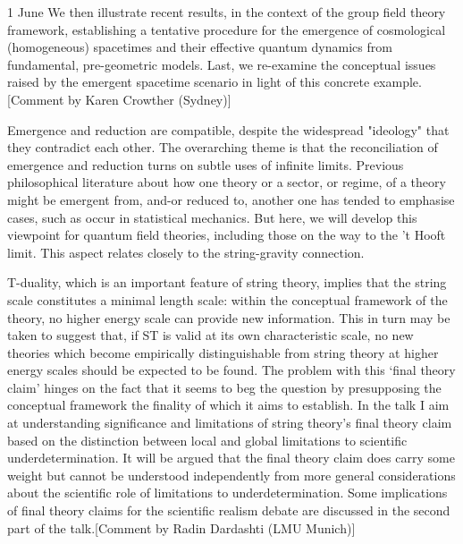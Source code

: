 \documentclass{conference}
\begin{document}
\begin{Day}{1 June}
{We then illustrate recent results, in the context of the group field theory framework, establishing a tentative procedure for the emergence of cosmological (homogeneous) spacetimes and their effective quantum dynamics from fundamental, pre-geometric models.
Last, we re-examine the conceptual issues raised by the emergent spacetime scenario in light of this concrete example.}[Comment by Karen Crowther (Sydney)]



  {Emergence and reduction are compatible, despite the widespread "ideology" that they contradict each other. The overarching theme is that the reconciliation of emergence and reduction turns on subtle uses of infinite limits. Previous philosophical literature about how one theory or a sector, or regime, of a theory might be emergent from, and-or reduced to, another one has tended to emphasise cases, such as occur in statistical mechanics. But here, we will develop this viewpoint for quantum field theories, including those on the way to the 't Hooft limit. This aspect relates closely to the string-gravity connection.}


    {T-duality, which is an important feature of string theory, implies that
the string scale constitutes a minimal length scale: within the conceptual
framework of the theory, no higher energy scale can provide new
information. This in turn may be taken to suggest that, if ST is valid at
its own characteristic scale, no new theories which become empirically
distinguishable from string theory at higher energy scales should be
expected to be found. The problem with this ‘final theory claim’ hinges on
the fact that it seems to beg the question by presupposing the conceptual
framework the finality of which it aims to establish. In the talk I aim at
understanding significance and limitations of string theory’s final theory
claim based on the distinction between local and global limitations to
scientific underdetermination. It will be argued that the final theory
claim does carry some weight but cannot be understood independently from
more general considerations about the scientific role of limitations to
underdetermination. Some implications of final theory claims for the
scientific realism debate are discussed in the second part of the talk.}[Comment by Radin Dardashti (LMU Munich)]


\end{Day}
\end{document}
